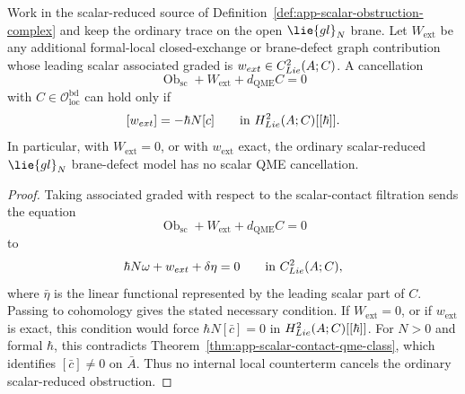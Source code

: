 \begin{thm}
\label{thm:app-ordinary-glN-scalar-obstruction-criterion}
  Work in the scalar-reduced source of
  Definition~\ref{def:app-scalar-obstruction-complex} and keep the
  ordinary trace on the open \(\lie{gl}_N\) brane.  Let
  \(W_{\mathrm{ext}}\) be any additional formal-local closed-exchange or
  brane-defect graph contribution whose leading scalar associated
  graded is \(w_{ext}\in C^2_{Lie}(A;C)\).  A
  cancellation
  \[
    \operatorname{Ob}_{\mathrm{sc}}
      +W_{\mathrm{ext}}+d_{\mathrm{QME}}C=0
  \]
  with \(C\in\mathcal O_{\mathrm{loc}}^{\mathrm{bd}}\) can hold only if
  \[
    [w_{ext}]=-\hbar N[c]
      \qquad\text{in }H^2_{Lie}(A;C)[[\hbar]].
  \]
  In particular, with \(W_{\mathrm{ext}}=0\), or with
  \(w_{\mathrm{ext}}\) exact, the ordinary scalar-reduced
  \(\lie{gl}_N\) brane-defect model has no scalar QME cancellation.
\end{thm}

\begin{proof}
  Taking associated graded with respect to the scalar-contact filtration
  sends the equation
  \[
    \operatorname{Ob}_{\mathrm{sc}}
      +W_{\mathrm{ext}}+d_{\mathrm{QME}}C=0
  \]
  to
  \[
    \hbar N\omega+w_{ext}+\delta\eta=0
      \qquad\text{in }C^2_{Lie}(A;C),
  \]
  where \(\bar\eta\) is the linear functional represented by the
  leading scalar part of \(C\).  Passing to cohomology gives the stated
  necessary condition.  If \(W_{\mathrm{ext}}=0\), or if
  \(w_{\mathrm{ext}}\) is exact, this condition would force
  \(\hbar N[\bar c]=0\) in \(H^2_{Lie}(A;C)[[\hbar]]\).
  For \(N>0\) and formal \(\hbar\), this
  contradicts Theorem~\ref{thm:app-scalar-contact-qme-class}, which
  identifies \([\bar c]\neq0\) on \(\bar A\).  Thus no internal local
  counterterm cancels the ordinary scalar-reduced obstruction.
\end{proof}
